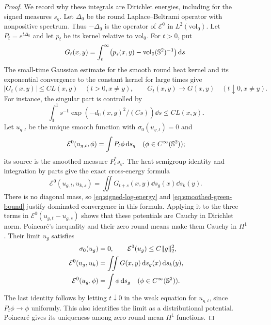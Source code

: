 \begin{proof}
We record why these integrals are Dirichlet energies, including for the
signed measures $s_g$.  Let $\Delta_0$ be the round Laplace--Beltrami
operator with nonpositive spectrum.  Thus $-\Delta_0$ is the operator of
$\mathcal E^0$ in $L^2(\mathrm{vol}_0)$.  Let $P_t=e^{t\Delta_0}$ and
let $p_t$ be its kernel relative to $\mathrm{vol}_0$.  For $t>0$, put
\[
 G_t(x,y)=\int_t^\infty
       \bigl(p_s(x,y)-\mathrm{vol}_0(\mathbb S^2)^{-1}\bigr)\,\mathrm d s.
\]
The small-time Gaussian estimate for the smooth round heat kernel and
its exponential convergence to the constant kernel for large times give
\begin{equation}\label{eq:smoothed-green-bound}
 |G_t(x,y)|\le C L(x,y)\quad(t>0, x\ne y),\qquad
 G_t(x,y)\longrightarrow G(x,y)\quad(t\downarrow0, x\ne y).
\end{equation}
For instance, the singular part is controlled by
\[
 \int_0^1 s^{-1}\exp(-d_0(x,y)^2/(Cs))\dd s\le C L(x,y).
\]
Let $u_{g,t}$ be the unique smooth function with $\sigma_0(u_{g,t})=0$
and
\[
 \mathcal E^0(u_{g,t},\phi)=\int P_t\phi\,\mathrm d s_g
 \quad(\phi\in C^\infty(\mathbb S^2));
\]
its source is the smoothed measure $P_t^*s_g$.  The heat semigroup identity and integration by parts give
the exact cross-energy formula
\begin{equation}\label{eq:smoothed-cross-energy}
 \mathcal E^0(u_{g,t},u_{k,s})
       =\iint G_{t+s}(x,y)\dd s_g(x)\dd s_k(y).
\end{equation}
There is no diagonal mass, so \eqref{eq:signed-log-energy} and
\eqref{eq:smoothed-green-bound} justify dominated convergence in this
formula.  Applying it to the three terms in
$\mathcal E^0(u_{g,t}-u_{g,s})$ shows that these potentials are Cauchy
in Dirichlet norm.  Poincar\'e's inequality and their zero round means
make them Cauchy in $H^1$.  Their limit $u_g$ satisfies
\begin{align}
 \sigma_0(u_g)&=0,\qquad \mathcal E^0(u_g)\le C\|g\|_2^2,
       \label{eq:potential-energy}\\
 \mathcal E^0(u_g,u_k)&=\iint G(x,y)\,\mathrm d s_g(x)\,\mathrm d s_k(y),
       \label{eq:cross-green-energy}\\
 \mathcal E^0(u_g,\phi)&=\int \phi\,\mathrm d s_g
       \quad(\phi\in C^\infty(\mathbb S^2)).\label{eq:smooth-potential-equation}
\end{align}
The last identity follows by letting $t\downarrow0$ in the weak equation
for $u_{g,t}$, since $P_t\phi\to\phi$ uniformly.  This also identifies
the limit as a distributional potential.  Poincar\'e gives its uniqueness
among zero-round-mean $H^1$ functions.


\end{proof}
